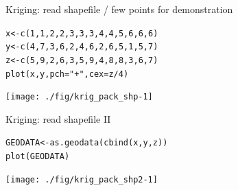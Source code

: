 \documentclass[xcolor=table,       handout,    xcolor=dvipsnames]{beamer}\usepackage[]{graphicx}\usepackage[]{color}
\makeatletter
\newcommand{\hlnum}[1]{\textcolor[rgb]{0,0,0}{#1}}
\newcommand{\hlstr}[1]{\textcolor[rgb]{0.545,0.137,0.137}{#1}}
\newcommand{\hlopt}[1]{\textcolor[rgb]{0,0,0}{#1}}
\newcommand{\hlstd}[1]{\textcolor[rgb]{0,0,0}{#1}}
\newcommand{\hlkwb}[1]{\textcolor[rgb]{0,0,0}{#1}}
\newcommand{\hlkwc}[1]{\textcolor[rgb]{1,0,1}{#1}}
\newcommand{\hlkwd}[1]{\textcolor[rgb]{0,0,1}{#1}}
\newenvironment{kframe}{%
 \def\at@end@of@kframe{}%
 \ifinner\ifhmode%
  \def\at@end@of@kframe{\end{minipage}}%
  \begin{minipage}{\columnwidth}%
 \fi\fi%
 \def\FrameCommand##1{\hskip\@totalleftmargin \hskip-\fboxsep
 \colorbox{shadecolor}{##1}\hskip-\fboxsep
     \hskip-\linewidth \hskip-\@totalleftmargin \hskip\columnwidth}%
 \MakeFramed {\advance\hsize-\width
   \@totalleftmargin\z@ \linewidth\hsize
   \@setminipage}}%
 {\par\unskip\endMakeFramed%
 \at@end@of@kframe}
\newenvironment{knitrout}{}{} %
\makeatother
\begin{document}
\begin{frame}[fragile]{Kriging: read shapefile / few points for demonstration}
\begin{knitrout}
\color{fgcolor}\begin{kframe}
\begin{alltt}
\hlstd{x} \hlkwb{<-} \hlkwd{c}\hlstd{(}\hlnum{1}\hlstd{,}\hlnum{1}\hlstd{,}\hlnum{2}\hlstd{,}\hlnum{2}\hlstd{,}\hlnum{3}\hlstd{,}\hlnum{3}\hlstd{,}\hlnum{3}\hlstd{,}\hlnum{4}\hlstd{,}\hlnum{4}\hlstd{,}\hlnum{5}\hlstd{,}\hlnum{6}\hlstd{,}\hlnum{6}\hlstd{,}\hlnum{6}\hlstd{)}
\hlstd{y} \hlkwb{<-} \hlkwd{c}\hlstd{(}\hlnum{4}\hlstd{,}\hlnum{7}\hlstd{,}\hlnum{3}\hlstd{,}\hlnum{6}\hlstd{,}\hlnum{2}\hlstd{,}\hlnum{4}\hlstd{,}\hlnum{6}\hlstd{,}\hlnum{2}\hlstd{,}\hlnum{6}\hlstd{,}\hlnum{5}\hlstd{,}\hlnum{1}\hlstd{,}\hlnum{5}\hlstd{,}\hlnum{7}\hlstd{)}
\hlstd{z} \hlkwb{<-} \hlkwd{c}\hlstd{(}\hlnum{5}\hlstd{,}\hlnum{9}\hlstd{,}\hlnum{2}\hlstd{,}\hlnum{6}\hlstd{,}\hlnum{3}\hlstd{,}\hlnum{5}\hlstd{,}\hlnum{9}\hlstd{,}\hlnum{4}\hlstd{,}\hlnum{8}\hlstd{,}\hlnum{8}\hlstd{,}\hlnum{3}\hlstd{,}\hlnum{6}\hlstd{,}\hlnum{7}\hlstd{)}
\hlkwd{plot}\hlstd{(x,y,} \hlkwc{pch}\hlstd{=}\hlstr{"+"}\hlstd{,} \hlkwc{cex}\hlstd{=z}\hlopt{/}\hlnum{4}\hlstd{)}
\end{alltt}
\end{kframe}

{\centering \texttt{[image: ./fig/krig\_pack\_shp-1]} 

}



\end{knitrout}
\vspace{-2em}
\end{frame}


\begin{frame}[fragile]{Kriging: read shapefile II}
\begin{knitrout}
\color{fgcolor}\begin{kframe}
\begin{alltt}
\hlstd{GEODATA} \hlkwb{<-} \hlkwd{as.geodata}\hlstd{(}\hlkwd{cbind}\hlstd{(x,y,z))}
\hlkwd{plot}\hlstd{(GEODATA)}
\end{alltt}
\end{kframe}

{\centering \texttt{[image: ./fig/krig\_pack\_shp2-1]} 

}



\end{knitrout}
\end{frame}
\end{document}
